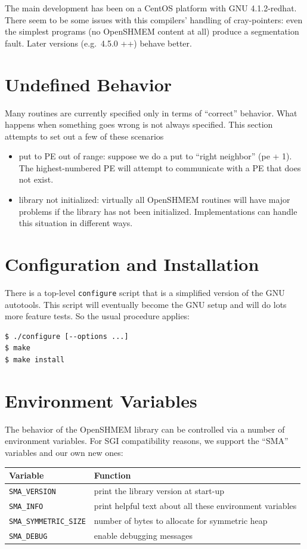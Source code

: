 \documentclass[english]{article}
\providecommand{\tabularnewline}{\\}
\begin{document}
The main development has been on a CentOS platform with GNU
4.1.2-redhat.  There seem to be some issues with this compilers'
handling of cray-pointers: even the simplest programs (no OpenSHMEM
content at all) produce a segmentation fault. Later versions
(e.g.\ 4.5.0 ++) behave better.

\section{Undefined Behavior}

Many routines are currently specified only in terms of ``correct''
behavior. What happens when something goes wrong is not always
specified.  This section attempts to set out a few of these scenarios
\begin{itemize}
\item put to PE out of range: suppose we do a put to ``right
neighbor'' (pe + 1). The highest-numbered PE will attempt to
communicate with a PE that does not exist.
\item library not initialized: virtually all OpenSHMEM routines will
have major problems if the library has not been
initialized. Implementations can handle this situation in different
ways.
\end{itemize}

\section{Configuration and Installation}

There is a top-level \texttt{configure} script that is a simplified
version of the GNU autotools. This script will eventually become the
GNU setup and will do lots more feature tests. So the usual procedure
applies:

\begin{lstlisting}
$ ./configure [--options ...]
$ make
$ make install
\end{lstlisting}

\section{Environment Variables\label{sec:Environment-Variables}}

The behavior of the OpenSHMEM library can be controlled via a number
of environment variables. For SGI compatibility reasons, we support
the ``SMA'' variables and our own new ones:

\medskip{}

\begin{tabular}{|l|l|}
\hline 
Variable & Function\tabularnewline
\hline
\hline 
\texttt{SMA\_VERSION} & print the library version at start-up\tabularnewline
\hline 
\texttt{SMA\_INFO} & print helpful text about all these environment variables\tabularnewline
\hline 
\texttt{SMA\_SYMMETRIC\_SIZE} & number of bytes to allocate for symmetric heap\tabularnewline
\hline 
\texttt{SMA\_DEBUG} & enable debugging messages\tabularnewline
\hline
\end{tabular}
\end{document}
